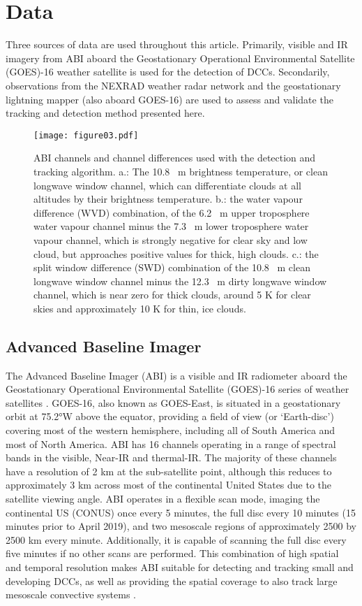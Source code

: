 \section{Data}

Three sources of data are used throughout this article.
Primarily, visible and IR imagery from ABI aboard the Geostationary Operational Environmental Satellite (GOES)-16 weather satellite is used for the detection of DCCs.
Secondarily, observations from the NEXRAD weather radar network and the geostationary lightning mapper (also aboard GOES-16) are used to assess and validate the tracking and detection method presented here.

\begin{figure}[t]
    \texttt{[image: figure03.pdf]}
    \caption{ABI channels and channel differences used with the detection and tracking algorithm. a.: The 10.8 \unit{\mu m} brightness temperature, or clean longwave window channel, which can differentiate clouds at all altitudes by their brightness temperature. b.: the water vapour difference (WVD) combination, of the 6.2 \unit{\mu m} upper troposphere water vapour channel minus the 7.3 \unit{\mu m} lower troposphere water vapour channel, which is strongly negative for clear sky and low cloud, but approaches positive values for thick, high clouds. c.: the split window difference (SWD) combination of the 10.8 \unit{\mu m} clean longwave window channel minus the 12.3 \unit{\mu m} dirty longwave window channel, which is near zero for thick clouds, around 5 \unit{K} for clear skies and approximately 10 \unit{K} for thin, ice clouds.}
    \label{fig:abi_channels}
\end{figure}

\subsection{Advanced Baseline Imager}


The Advanced Baseline Imager (ABI) is a visible and IR radiometer aboard the Geostationary Operational Environmental Satellite (GOES)-16 series of weather satellites \citep{schmit_closer_2016}.
GOES-16, also known as GOES-East, is situated in a geostationary orbit at 75.2°W above the equator, providing a field of view (or `Earth-disc') covering most of the western hemisphere, including all of South America and most of North America.
ABI has 16 channels operating in a range of spectral bands in the visible, Near-IR and thermal-IR.
The majority of these channels have a resolution of 2 \unit{km} at the sub-satellite point, although this reduces to approximately 3 \unit{km} across most of the continental United States due to the satellite viewing angle.
ABI operates in a flexible scan mode, imaging the continental US (CONUS) once every 5 minutes, the full disc every 10 minutes (15 minutes prior to April 2019), and two mesoscale regions of approximately 2500 by 2500 \unit{km} every minute.
Additionally, it is capable of scanning the full disc every five minutes if no other scans are performed.
This combination of high spatial and temporal resolution makes ABI suitable for detecting and tracking small and developing DCCs, as well as providing the spatial coverage to also track large mesoscale convective systems \citep{heikenfeld_tobac_2019}.

